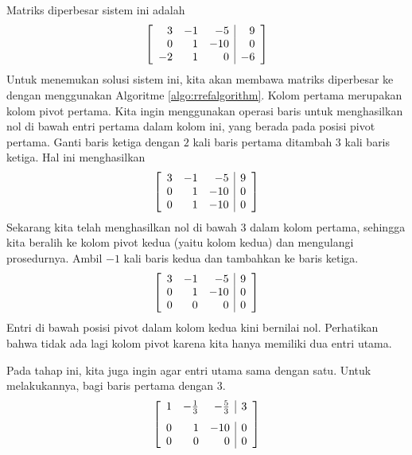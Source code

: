 \begin{solution} Matriks diperbesar sistem ini adalah
\begin{equation*}
\left[
\begin{array}{rrr|r}
 3 & -1 &  -5 & 9 \\
 0 &  1 & -10 & 0 \\
-2 &  1 &   0 & -6
\end{array}
\right]
\end{equation*}
Untuk menemukan solusi sistem ini, kita akan membawa matriks diperbesar ke \rref{} dengan menggunakan Algoritme \ref{algo:rrefalgorithm}.
Kolom pertama merupakan kolom pivot pertama. Kita ingin menggunakan operasi baris untuk menghasilkan nol di bawah entri pertama dalam kolom ini, yang berada
pada posisi pivot pertama.
Ganti baris ketiga dengan $2$ kali baris pertama ditambah $3$ kali
baris ketiga. Hal ini menghasilkan
\begin{equation*}
\left[
\begin{array}{rrr|r}
3 & -1 & -5 & 9 \\
0 & 1 & -10 & 0 \\
0 & 1 & -10 & 0
\end{array}
\right] 
\end{equation*}
Sekarang kita telah menghasilkan nol di bawah $3$ dalam kolom pertama, sehingga kita beralih ke kolom pivot kedua (yaitu kolom kedua) dan mengulangi prosedurnya.
Ambil $-1$ kali baris kedua dan tambahkan ke baris ketiga.
\begin{equation*}
\left[
\begin{array}{rrr|r}
3 & -1 &  -5 & 9 \\
0 &  1 & -10 & 0 \\
0 &  0 &   0 & 0
\end{array}
\right]
\end{equation*}
Entri di bawah posisi pivot dalam kolom kedua kini bernilai nol. Perhatikan bahwa tidak ada lagi kolom pivot karena kita
hanya memiliki dua entri utama.

Pada tahap ini, kita juga ingin agar entri utama sama dengan satu. Untuk melakukannya, bagi baris pertama dengan $3$.
\begin{equation*}
\leftB
\begin{array}{rrr|r}
1 & -\vspace{0.05in}\frac{1}{3} &  -\vspace{0.05in}\frac{5}{3} & 3 \\
0 &  1 & -10 & 0 \\
0 &  0 &   0 & 0
\end{array}
\rightB
\end{equation*}


\end{solution}
